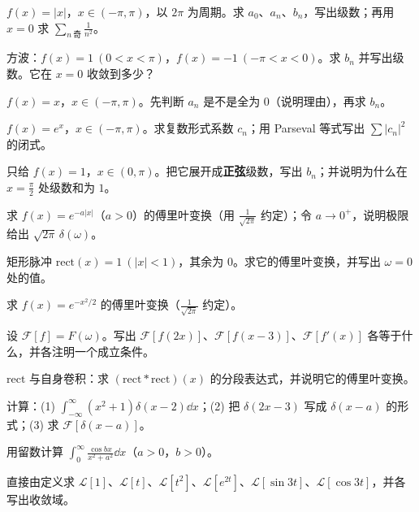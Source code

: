 \documentclass[11pt]{ctexart}
\begin{document}
\flowerrule


$f(x)=|x|$，$x\in(-\pi,\pi)$，以 $2\pi$ 为周期。求 $a_0$、$a_n$、$b_n$，写出级数；再用 $x=0$ 求 $\sum_{n\ \text{奇}}\frac{1}{n^2}$。

方波：$f(x)=1\ (0<x<\pi)$，$f(x)=-1\ (-\pi<x<0)$。求 $b_n$ 并写出级数。它在 $x=0$ 收敛到多少？

$f(x)=x$，$x\in(-\pi,\pi)$。先判断 $a_n$ 是不是全为 $0$（说明理由），再求 $b_n$。

$f(x)=e^{x}$，$x\in(-\pi,\pi)$。求复数形式系数 $c_n$；用 Parseval 等式写出 $\sum|c_n|^2$ 的闭式。

只给 $f(x)=1$，$x\in(0,\pi)$。把它展开成\textbf{正弦}级数，写出 $b_n$；并说明为什么在 $x=\frac{\pi}{2}$ 处级数和为 $1$。

求 $f(x)=e^{-a|x|}$（$a>0$）的傅里叶变换（用 $\frac{1}{\sqrt{2\pi}}$ 约定）；令 $a\to0^{+}$，说明极限给出 $\sqrt{2\pi}\,\delta(\omega)$。

矩形脉冲 $\mathrm{rect}(x)=1\ (|x|<1)$，其余为 $0$。求它的傅里叶变换，并写出 $\omega=0$ 处的值。

求 $f(x)=e^{-x^2/2}$ 的傅里叶变换（$\frac{1}{\sqrt{2\pi}}$ 约定）。

设 $\mathcal F[f]=F(\omega)$。写出 $\mathcal F[f(2x)]$、$\mathcal F[f(x-3)]$、$\mathcal F[f'(x)]$ 各等于什么，并各注明一个成立条件。

$\mathrm{rect}$ 与自身卷积：求 $(\mathrm{rect}*\mathrm{rect})(x)$ 的分段表达式，并说明它的傅里叶变换。

计算：(1) $\int_{-\infty}^{\infty}(x^2+1)\delta(x-2)\dd x$；(2) 把 $\delta(2x-3)$ 写成 $\delta(x-a)$ 的形式；(3) 求 $\mathcal F[\delta(x-a)]$。

用留数计算 $\int_{0}^{\infty}\frac{\cos bx}{x^2+a^2}\dd x$（$a>0$，$b>0$）。


直接由定义求 $\mathcal L[1]$、$\mathcal L[t]$、$\mathcal L[t^2]$、$\mathcal L[e^{2t}]$、$\mathcal L[\sin 3t]$、$\mathcal L[\cos 3t]$，并各写出收敛域。
\end{document}
